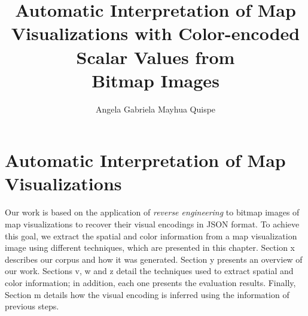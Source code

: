 \documentclass[a4paper,12pt,twoside,openright]{book}
\title{Automatic Interpretation of Map Visualizations with Color-encoded Scalar Values from \\Bitmap Images}
\author{Angela Gabriela Mayhua Quispe}
\begin{document}
\maketitle 




 

\tableofcontents 
\listoftables 
{}
\listoffigures 
{}


\clearpage 
{} 






\chapter{Automatic Interpretation of Map Visualizations}
\label{ch:proposal}
Our work is based on the application of \textit{reverse engineering} to bitmap images of map visualizations to recover their visual encodings in \ac{JSON} format. To achieve this goal, we extract the spatial and color information from a map visualization image using different techniques, which are presented in this chapter.
%
Section x describes our corpus and how it was generated. Section y presents an overview of our work. Sections v, w and z detail the techniques used to extract spatial and color information; in addition, each one presents the evaluation results. Finally, Section m details how the visual encoding is inferred using the information of previous steps.





%


\end{document}
